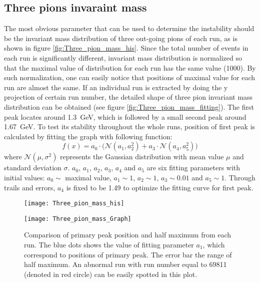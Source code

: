 \subsection{Three pions invaraint mass}
The most obvious parameter that can be used to determine the instability should be the invariant mass distribution of three out-going pions of each run, as is shown in figure \ref{fig:Three_pion_mass_his}. Since the total number of events in each run is significantly different, invariant mass distribution is normalized so that the maximal value of distribution for each run has the same value (1000). By such normalization, one can easily notice that positions of maximal value for each run are almost the same. If an individual run is extracted by doing the y projection of certain run number, the detailed shape of three pion invariant mass distribution can be obtained (see figure \ref{fig:Three_pion_mass_fitting}). The first peak locates around \SI{1.3}{\giga\electronvolt}, which is followed by a small second peak around \SI{1.67}{\giga\electronvolt}. To test its stability throughout the whole runs, position of first peak is calculated by fitting the graph with following function:
\begin{equation}
f(x) = a_0 \cdot \Big(\mathcal{N}(a_1, a_2^2)+a_3 \cdot \mathcal{N}(a_4, a_5^2)\Big)
\end{equation}
where $\mathcal{N}(\mu,\sigma^2)$ represents the Gaussian distribution with mean value $\mu$ and standard deviation $\sigma$. $a_0$, $a_1$, $a_2$, $a_3$, $a_4$ and $a_5$ are six fitting parameters with initial values: $a_0 \sim$ maximal value, $a_1 \sim 1$, $a_2 \sim 1$, $a_3 \sim 0.01$ and $a_5 \sim 1$. Through trails and errors, $a_4$ is fixed to be 1.49 to optimize the fitting curve for first peak.

\begin{figure*}[!ht]
	\centering
	\vspace{2cm}
	\texttt{[image: Three\_pion\_mass\_his]}
	\caption{Histogram of invariant mass distribution of three pions for each run. The colors inside the histogram represent number of events corresponding to run number and invariant mass. To better compare and conceive the structure of distribution between runs visually, the maximal value of each distribution is normalized to 1000. As one can easily notice that maximal value or peak of distribution locates around \SI{1.3}{\giga\electronvolt} for almost every run.}
	\label{fig:Three_pion_mass_his}
	\vspace{2 cm}
	
	\texttt{[image: Three\_pion\_mass\_Graph]}
	\caption{Comparison of primary peak position and half maximum from each run. The blue dots shows the value of fitting parameter $a_1$, which correspond to positions of primary peak. The error bar the range of half maximum. An abnormal run with run number equal to 69811 (denoted in red circle) can be easily spotted in this plot.}
	\label{fig:Three_pion_mass_Graph}
	\vspace{2cm}
\end{figure*}

